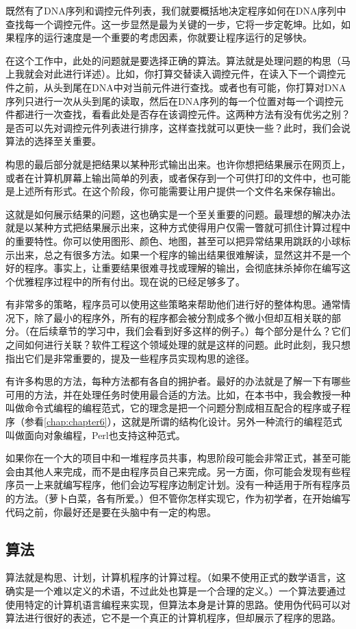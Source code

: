 既然有了DNA序列和调控元件列表，我们就要概括地决定程序如何在DNA序列中查找每一个调控元件。这一步显然是最为关键的一步，它将一步定乾坤。比如，如果程序的运行速度是一个重要的考虑因素，你就要让程序运行的足够快。

在这个工作中，此处的问题就是要选择正确的算法。算法就是处理问题的构思（马上我就会对此进行详述）。比如，你打算交替读入调控元件，在读入下一个调控元件之前，从头到尾在DNA中对当前元件进行查找。或者也有可能，你打算对DNA序列只进行一次从头到尾的读取，然后在DNA序列的每一个位置对每一个调控元件都进行一次查找，看看此处是否存在该调控元件。这两种方法有没有优劣之别？是否可以先对调控元件列表进行排序，这样查找就可以更快一些？此时，我们会说算法的选择至关重要。

构思的最后部分就是把结果以某种形式输出出来。也许你想把结果展示在网页上，或者在计算机屏幕上输出简单的列表，或者保存到一个可供打印的文件中，也可能是上述所有形式。在这个阶段，你可能需要让用户提供一个文件名来保存输出。

这就是如何展示结果的问题，这也确实是一个至关重要的问题。最理想的解决办法就是以某种方式把结果展示出来，这种方式使得用户仅需一瞥就可抓住计算过程中的重要特性。你可以使用图形、颜色、地图，甚至可以把异常结果用跳跃的小球标示出来，总之有很多方法。如果一个程序的输出结果很难解读，显然这并不是一个好的程序。事实上，让重要结果很难寻找或理解的输出，会彻底抹杀掉你在编写这个优雅程序过程中的所有付出。现在说的已经足够多了。

有非常多的策略，程序员可以使用这些策略来帮助他们进行好的整体构思。通常情况下，除了最小的程序外，所有的程序都会被分割成多个微小但却互相关联的部分。（在后续章节的学习中，我们会看到好多这样的例子。）每个部分是什么？它们之间如何进行关联？软件工程这个领域处理的就是这样的问题。此时此刻，我只想指出它们是非常重要的，提及一些程序员实现构思的途径。

有许多构思的方法，每种方法都有各自的拥护者。最好的办法就是了解一下有哪些可用的方法，并在处理任务时使用最合适的方法。比如，在本书中，我会教授一种叫做命令式编程的编程范式，它的理念是把一个问题分割成相互配合的程序或子程序（参看\autoref{chap:chapter6}），这就是所谓的结构化设计。另外一种流行的编程范式叫做面向对象编程，Perl也支持这种范式。

如果你在一个大的项目中和一堆程序员共事，构思阶段可能会非常正式，甚至可能会由其他人来完成，而不是由程序员自己来完成。另一方面，你可能会发现有些程序员一上来就编写程序，他们会边写程序边制定计划。没有一种适用于所有程序员的方法。（萝卜白菜，各有所爱。）但不管你怎样实现它，作为初学者，在开始编写代码之前，你最好还是要在头脑中有一定的构思。

\subsection{算法}
算法就是构思、计划，计算机程序的计算过程。（如果不使用正式的数学语言，这确实是一个难以定义的术语，不过此处也算是一个合理的定义。）一个算法要通过使用特定的计算机语言编程来实现，但算法本身是计算的思路。使用伪代码可以对算法进行很好的表述，它不是一个真正的计算机程序，但却展示了程序的思路。

